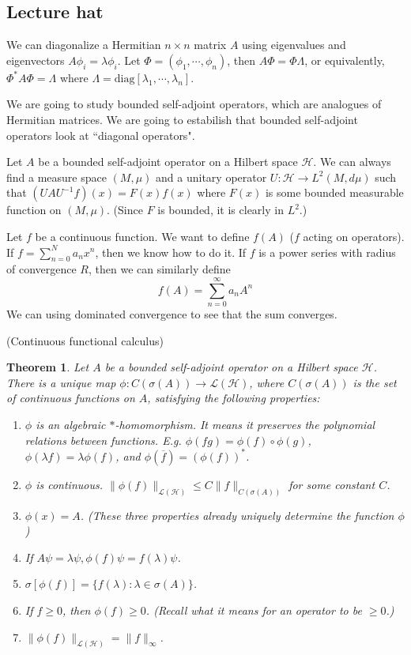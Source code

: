 \documentclass[12pt]{article}
\theoremstyle{plain}
\newtheorem{theorem}[equation]{Theorem}
\theoremstyle{definition}
\theoremstyle{named}
\newcommand{\shH}{\mathscr{H}}
\newcommand{\shL}{\mathscr{L}}
\newcommand{\<}{\langle}
\renewcommand{\>}{\rangle}
\begin{document}
\subsection*{Lecture hat}
We can diagonalize a Hermitian $n \times n$ matrix $A$ using eigenvalues and eigenvectors $A \phi_i = \lambda \phi_i$. Let $\Phi = (\phi_1, \cdots, \phi_n)$, then $A \Phi = \Phi \Lambda$, or equivalently, $\Phi^* A \Phi = \Lambda$ where $\Lambda = \mathrm{diag}[\lambda_1, \cdots, \lambda_n]$. 

We are going to study bounded self-adjoint operators, which are analogues of Hermitian matrices. We are going to estabilish that bounded self-adjoint operators look at ``diagonal operators". 

Let $A$ be a bounded self-adjoint operator on a Hilbert space $\shH$. We can always find a measure space $(M, \mu)$ and a unitary operator $U : \shH \to L^2(M, d \mu)$ such that $(U A U^{-1} f)(x) = F(x) f(x)$ where $F(x)$ is some bounded measurable function on $(M, \mu)$. (Since $F$ is bounded, it is clearly in $L^2$.)

Let $f$ be a continuous function. We want to define $f(A)$ ($f$ acting on operators). If $f = \sum_{n = 0}^N a_n x^n$, then we know how to do it. If $f$ is a power series with radius of convergence $R$, then we can similarly define 
$$ f(A) = \sum_{n = 0}^\infty a_n A^n $$
We can using dominated convergence to see that the sum converges. 

(Continuous functional calculus)
\begin{theorem}
Let $A$ be a bounded self-adjoint operator on a Hilbert space $\shH$. There is a unique map $\phi : C(\sigma(A)) \to \shL(\shH)$, where $ C(\sigma(A))$ is the set of continuous functions on $A$, satisfying the following properties:
\begin{enumerate}
\item $\phi$ is an algebraic $*$-homomorphism. It means it preserves the polynomial relations between functions. E.g. $\phi(fg) = \phi(f) \circ \phi(g)$,  $\phi(\lambda f) = \lambda \phi(f)$, and $\phi(\overline{f}) = (\phi(f))^*$. 
\item $\phi$ is continuous. $\| \phi(f) \|_{\shL(\shH)} \le C \| f \|_{C(\sigma(A))}$ for some constant $C$. 
\item $\phi(x) = A$. (These three properties already uniquely determine the function $\phi$)
\item If $A \psi = \lambda \psi, \phi(f) \psi = f(\lambda) \psi$. 
\item $\sigma[\phi(f)] = \{ f(\lambda) : \lambda \in \sigma(A) \}$. 
\item If $f \ge 0$, then $\phi(f) \ge 0$. (Recall what it means for an operator to be $\ge 0$.)
\item $\| \phi(f) \|_{\shL(\shH)} = \| f \|_\infty $.
\end{enumerate}
\end{theorem}
\end{document}
